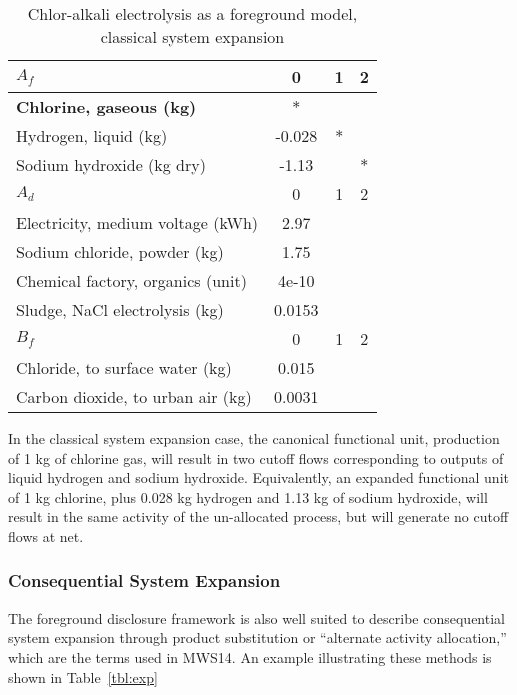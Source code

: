\begin{table}[h]
  \begin{center}
  \caption{Chlor-alkali electrolysis as a foreground model, classical system expansion}
  \label{tbl:cse}
  \footnotesize\sffamily
  \begin{tabular}{l|ccc}
    \midrule
    \bf $A_f$ & 0 & 1 & 2 \\
    \midrule
    \textbf{Chlorine, gaseous (kg)} & $\ast$ & & \\
    Hydrogen, liquid (kg) & -0.028 & $\ast$ & \\
    Sodium hydroxide (kg dry) & -1.13 & & $\ast$ \\
    \midrule
    \bf $A_d$ & 0 & 1 & 2 \\
    \midrule
    Electricity, medium voltage (kWh) & 2.97 &  &  \\
    Sodium chloride, powder (kg) & 1.75 &  & \\
    Chemical factory, organics (unit) & 4e-10 &  &  \\
    Sludge, NaCl electrolysis (kg) & 0.0153 &  &  \\
    \midrule
    \bf $B_f$ & 0 & 1 & 2 \\
    \midrule
    Chloride, to surface water (kg) & 0.015 &  &  \\
    Carbon dioxide, to urban air (kg) & 0.0031 &  &  \\
    \midrule
  \end{tabular}
  \end{center}
\end{table}

In the classical system expansion case, the canonical functional unit, production of 1 kg of chlorine gas, will result in two cutoff flows corresponding to outputs of liquid hydrogen and sodium hydroxide.  Equivalently, an expanded functional unit of 1 kg chlorine, plus 0.028 kg hydrogen and 1.13 kg of sodium hydroxide, will result in the same activity of the un-allocated process, but will generate no cutoff flows at net.

\subsubsection{Consequential System Expansion}

The foreground disclosure framework is also well suited to describe consequential system expansion through product substitution or ``alternate activity allocation,'' which are the terms used in MWS14.  An example illustrating these methods is shown in Table~\ref{tbl:exp}

